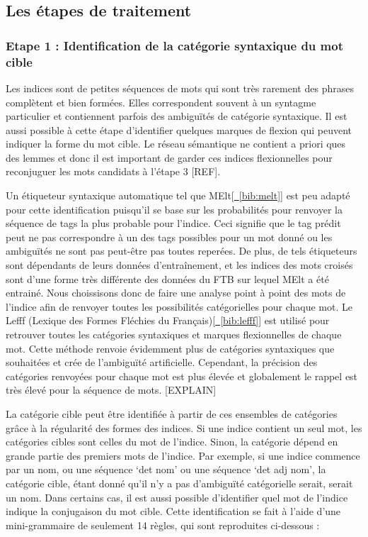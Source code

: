 \documentclass[a4paper, 12pt]{article}
\begin{document}
\subsection{Les étapes de traitement}
\subsubsection{Etape 1 : Identification de la catégorie syntaxique du mot cible}
Les indices sont de petites séquences de mots qui sont très rarement des phrases complètent et bien formées. Elles correspondent souvent à un syntagme particulier et contiennent parfois des ambiguïtés de catégorie syntaxique. Il est aussi possible à cette étape d'identifier quelques marques de flexion qui peuvent indiquer la forme du mot cible. Le réseau sémantique ne contient a priori ques des lemmes et donc il est important de garder ces indices flexionnelles pour reconjuguer les mots candidats à l'étape 3 [REF].  

Un étiqueteur syntaxique automatique tel que MElt[\hyperref[bib:melt]{~\ref*{bib:melt}}] est peu adapté pour cette identification puisqu'il se base sur les probabilités pour renvoyer la séquence de tags la plus probable pour l'indice. Ceci signifie que le tag prédit peut ne pas correspondre à un des tags possibles pour un mot donné ou les ambiguïtés ne sont pas peut-être pas toutes reperées. De plus, de tels étiqueteurs sont dépendants de leurs données d'entraînement, et les indices des mots croisés sont d'une forme très différente des données du FTB sur lequel MElt a été entrainé. Nous choissisons donc de faire une analyse point à point des mots de l'indice afin de renvoyer toutes les possibilités catégorielles pour chaque mot. Le Lefff (Lexique des Formes Fléchies du Français)[\hyperref[bib:lefff]{~\ref*{bib:lefff}}] est utilisé pour retrouver toutes les catégories syntaxiques et marques flexionnelles de chaque mot. Cette méthode renvoie évidemment plus de catégories syntaxiques que souhaitées et crée de l'ambiguïté artificielle. Cependant, la précision des catégories renvoyées pour chaque mot est plus élevée et globalement le rappel est très élevé pour la séquence de mots. [EXPLAIN]

La catégorie cible peut être identifiée à partir de ces ensembles de catégories grâce à la régularité des formes des indices. Si une indice contient un seul mot, les catégories cibles sont celles du mot de l'indice. Sinon, la catégorie dépend en grande partie des premiers mots de l'indice. Par exemple, si une indice commence par un nom, ou une séquence \lq{det nom}\rq{} ou une séquence \lq{det adj nom}\rq{}, la catégorie cible, étant donné qu'il n'y a pas d'ambiguïté catégorielle serait, serait un nom. Dans certains cas, il est aussi possible d'identifier quel mot de l'indice indique la conjugaison du mot cible. Cette identification se fait à l'aide d'une mini-grammaire de seulement 14 règles, qui sont reproduites ci-dessous :
\end{document}
